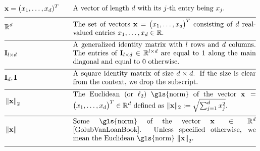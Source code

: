 \begin{align} 
	 &\featurevec=\big(\feature_{1},\ldots,\feature_{\featuredim})^{T} &\quad & \parbox{.75\textwidth}{A vector of length $\featuredim$ with its 
		$\featureidx$-th entry being $\feature_{\featureidx}$.} \nonumber \\[2mm] \hline \nonumber\\[-5mm]
	&\mathbb{R}^{\featuredim} & \quad &  \parbox{.75\textwidth}{The set of vectors $\featurevec=\big(\feature_{1},\ldots,\feature_{\featurelen}\big)^{T}$ consisting of $\featuredim$ real-valued entries $\feature_{1},\ldots,\feature_{\featurelen} \in \mathbb{R}$.} \nonumber \\[2mm] \hline \nonumber\\[-5mm]
	&\mathbf{I}_{\modelidx \times \featuredim}  & \quad &  \parbox{.75\textwidth}{A generalized identity matrix 
		with $\modelidx$ rows and $\featuredim$ columns. The entries of $\mathbf{I}_{\modelidx \times \featuredim} \in \mathbb{R}^{\modelidx \times \featuredim}$ 
		are equal to $1$ along the main diagonal and equal to $0$ otherwise. }\nonumber \\[2mm] \hline \nonumber\\[-5mm] %
	&\mathbf{I}_{\dimlocalmodel}, \mathbf{I} & \quad &  \parbox{.75\textwidth}{A square identity 
		matrix of size $\dimlocalmodel \times \dimlocalmodel$. If the size is clear from the 
		context, we drop the subscript.} \nonumber \\[2mm] \hline \nonumber\\[-5mm]
	&\normgeneric{\featurevec}{2}  &\quad & \parbox{.75\textwidth}{The Euclidean (or $\ell_{2}$) \gls{norm} of the vector 
		$\featurevec=\big(\feature_{1},\ldots,\feature_{\featurelen}\big)^{T} \in \mathbb{R}^{\featuredim}$ defined as $ \| \featurevec \|_{2} \defeq \sqrt{\sum_{\featureidx=1}^{\featuredim} \feature_{\featureidx}^{2}}$.} \nonumber \\[2mm] \hline \nonumber\\[-5mm] 
	&\normgeneric{\featurevec}{}  & \quad &  \parbox{.75\textwidth}{Some \gls{norm} of the vector $\featurevec \in \mathbb{R}^{\featuredim}$ \cite{GolubVanLoanBook}. Unless specified otherwise, we mean the Euclidean \gls{norm} $\normgeneric{\featurevec}{2}$.} \nonumber \\[2mm] \hline \nonumber\\[-5mm]

\end{align}
